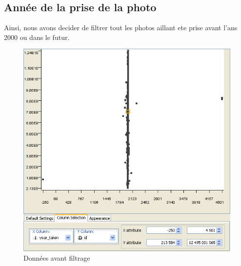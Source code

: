     \pagebreak
    \subsection{Ann\'ee de la prise de la photo}
        Ainsi, nous avons decider de filtrer tout les photos aillant ete prise
        avant l'ans 2000 ou dans le futur.

        \begin{figure}[h]
            \centering
            \includegraphics[scale=0.35]{../screenshots/year_id_before.png}
            \caption{Donn\'ees avant filtrage}
            \label{diagram:year_id_before}
        \end{figure}

